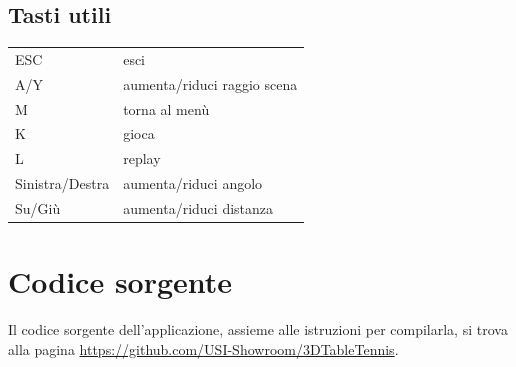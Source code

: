 \documentclass[12pt]{article}
\begin{document}
	\subsection{Tasti utili}
	
	\begin{tabular}{l l}
		ESC & esci\\
		A/Y & aumenta/riduci raggio scena\\
		M & torna al menù\\
		K & gioca\\
		L & replay\\
		Sinistra/Destra & aumenta/riduci angolo\\
		Su/Giù & aumenta/riduci distanza\\
	\end{tabular}
		
		
\section{Codice sorgente}

	Il codice sorgente dell'applicazione, assieme alle istruzioni per compilarla, si trova alla pagina \url{https://github.com/USI-Showroom/3DTableTennis}.
		
	
\end{document}
